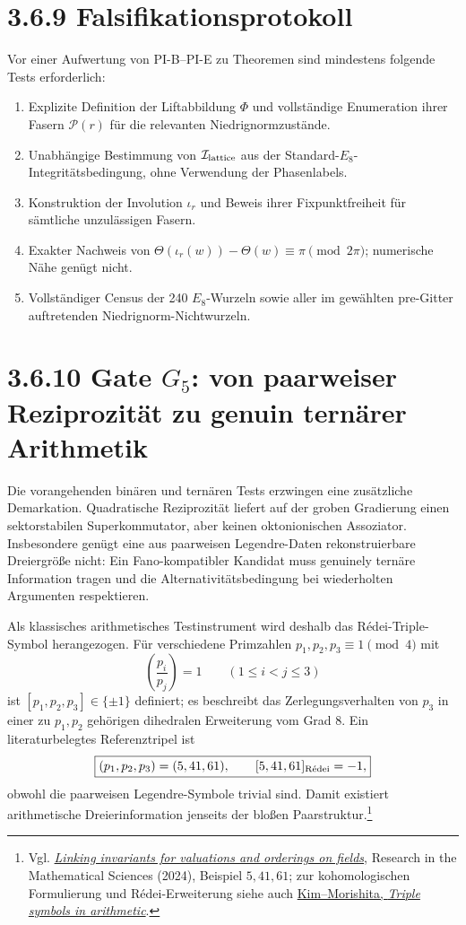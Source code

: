 \documentclass[11pt,a4paper]{article}
\begin{document}
\section*{3.6.9 Falsifikationsprotokoll}
Vor einer Aufwertung von PI-B--PI-E zu Theoremen sind mindestens folgende Tests erforderlich:
\begin{enumerate}[leftmargin=1.6em]
\item Explizite Definition der Liftabbildung $\Phi$ und vollständige Enumeration ihrer Fasern $\mathcal P(r)$ für die relevanten Niedrignormzustände.
\item Unabhängige Bestimmung von $\mathcal I_{\rm lattice}$ aus der Standard-$E_8$-Integritätsbedingung, ohne Verwendung der Phasenlabels.
\item Konstruktion der Involution $\iota_r$ und Beweis ihrer Fixpunktfreiheit für sämtliche unzulässigen Fasern.
\item Exakter Nachweis von $\Theta(\iota_r(w))-\Theta(w)\equiv\pi\pmod{2\pi}$; numerische Nähe genügt nicht.
\item Vollständiger Census der 240 $E_8$-Wurzeln sowie aller im gewählten pre-Gitter auftretenden Niedrignorm-Nichtwurzeln.
\end{enumerate}


\section*{3.6.10 Gate $G_5$: von paarweiser Reziprozität zu genuin ternärer Arithmetik}
Die vorangehenden binären und ternären Tests erzwingen eine zusätzliche Demarkation. Quadratische Reziprozität liefert auf der groben Gradierung einen sektorstabilen Superkommutator, aber keinen oktonionischen Assoziator. Insbesondere genügt eine aus paarweisen Legendre-Daten rekonstruierbare Dreiergröße nicht: Ein Fano-kompatibler Kandidat muss genuinely ternäre Information tragen und die Alternativitätsbedingung bei wiederholten Argumenten respektieren.

Als klassisches arithmetisches Testinstrument wird deshalb das Rédei-Triple-Symbol herangezogen. Für verschiedene Primzahlen $p_1,p_2,p_3\equiv1\pmod4$ mit
\[
\left(\frac{p_i}{p_j}\right)=1\qquad(1\le i<j\le3)
\]
ist $[p_1,p_2,p_3]\in\{\pm1\}$ definiert; es beschreibt das Zerlegungsverhalten von $p_3$ in einer zu $p_1,p_2$ gehörigen dihedralen Erweiterung vom Grad $8$. Ein literaturbelegtes Referenztripel ist
\[
\boxed{(p_1,p_2,p_3)=(5,41,61),\qquad [5,41,61]_{\rm R\acute ede i}=-1,}
\]
obwohl die paarweisen Legendre-Symbole trivial sind. Damit existiert arithmetische Dreierinformation jenseits der bloßen Paarstruktur.\footnote{Vgl. \href{https://link.springer.com/article/10.1007/s40687-024-00476-5}{\emph{Linking invariants for valuations and orderings on fields}}, Research in the Mathematical Sciences (2024), Beispiel $5,41,61$; zur kohomologischen Formulierung und Rédei-Erweiterung siehe auch \href{https://link.springer.com/article/10.1007/s40993-025-00648-4}{Kim--Morishita, \emph{Triple symbols in arithmetic}}.}
\end{document}

